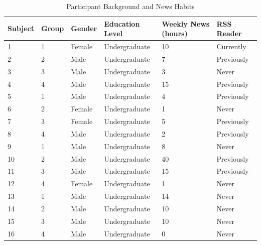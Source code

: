 \begin{table}[hbtp!]
\centering
\caption{Participant Background and News Habits} \vspace{0.3cm}
\label{tab:participants}
\begin{tabular}{|llllll|}
\hline
Subject & Group & Gender & Education Level & Weekly News (hours) & RSS Reader \\ \hline\hline
1       & 1     & Female & Undergraduate   & 10                  & Currently  \\ 
2       & 2     & Male   & Undergraduate   & 7                   & Previously \\  
3       & 3     & Male   & Undergraduate   & 3                   & Never      \\  
4       & 4     & Male   & Undergraduate   & 15                  & Previously \\  
5       & 1     & Male   & Undergraduate   & 4                   & Previously \\  
6       & 2     & Female & Undergraduate   & 1                   & Never      \\  
7       & 3     & Female & Undergraduate   & 5                   & Previously \\  
8       & 4     & Male   & Undergraduate   & 2                   & Previously \\  
9       & 1     & Male   & Undergraduate   & 8                   & Never      \\  
10      & 2     & Male   & Undergraduate   & 40                  & Previously \\ 
11      & 3     & Male   & Undergraduate   & 15                  & Previously \\ 
12      & 4     & Female & Undergraduate   & 1                   & Never      \\ 
13      & 1     & Male   & Undergraduate   & 14                  & Never      \\
14      & 2     & Male   & Undergraduate   & 10                  & Never      \\ 
15      & 3     & Male   & Undergraduate   & 10                  & Never      \\
16      & 4     & Male   & Undergraduate   & 0                   & Never\\ \hline     
\end{tabular}
\end{table}

\clearpage

